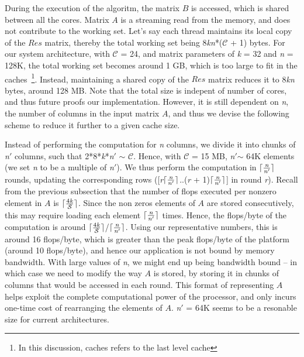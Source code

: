      During the execution of the algoritm, the matrix $B$ is
     accessed, which is shared between all the cores. Matrix $A$ is a
     streaming read from the memory, and does not contribute to
     the working set. Let's say each thread maintains  its local copy
     of the $Res$ matrix, thereby the total working set being
     8{\it{kn}}*($\mathcal{C}$ + 1) bytes. For our system
     architecture, with $\mathcal{C}$ = 24, and matrix parameters of
     {\it{k}} = 32 and {\it{n}} = 128K, the total working set becomes
     around 1 GB, which is too large to fit in the
     caches~\footnote{In this discussion, caches refers to the last
     level cache}. Instead,
     maintaining a shared copy of the $Res$ matrix reduces it to
     8{\it{kn}} bytes, around 128 MB. Note that the
     total size is indepent of number of cores, and thus future
     proofs our implementation.
     However, it is still dependent on {\it{n}}, the
     number of columns in the input matrix $A$, and thus we devise the
     following scheme to reduce it further to a given cache size.

     Instead of performing the computation for {\it{n}} columns, we
     divide it into chunks of {\it{n}}$'$ columns, such that
     2*8*{\it{k}}*{\it{n}}$'$ $\sim$ $\mathcal{C}$. Hence, with
     $\mathcal{C}$ = 15 MB,  {\it{n}}$'$$\sim$ 64K elements (we set
     {\it{n}} to be a multiple of {\it{n}}$'$). %
     We thus perform the computation in
     $\lceil\frac{\it{n}}{\it{n}'}\rceil$ rounds, 
     updating the corresponding rows
     ([{\it{r}}$\lceil\frac{\it{n}}{\it{n}'}\rceil$..({\it{r}} +
     1)$\lceil\frac{\it{n}}{\it{n}'}\rceil$]
     in round {\it{r}}).
     Recall from the previous subsection that the number of flops
     executed per nonzero element in $A$ is
     $\lceil\frac{4{\it{k}}}{\mathcal{S}}\rceil$.
     Since the non zeros elements of $A$ are stored consecutively, 
     this may require loading each element
     $\lceil\frac{\it{n}}{\it{n}'}\rceil$ times. Hence, the flops/byte
     of the computation is around
     $\lceil\frac{4{\it{k}}}{\mathcal{S}}\rceil$/$\lceil\frac{\it{n}}{\it{n}'}\rceil$.
     Using our representative numbers, this is around 16 flops/byte,
     which is greater than the peak flops/byte of the platform (around
     10 flops/byte), and
     hence our application is not bound by memory bandwidth. With
     large values of {\it{n}}, we might end up being bandwidth bound
     -- in which case we need to modify the way $A$ is stored, by
     storing it in chunks of columns that would be accessed in each
     round. This format of representing $A$  helps 
     exploit the complete computational power of the processor, 
     and only incurs
     one-time cost of rearranging  the elements of $A$.
     {\it{n}}$'$ = 64K seems to be a resonable size for current
     architectures.


